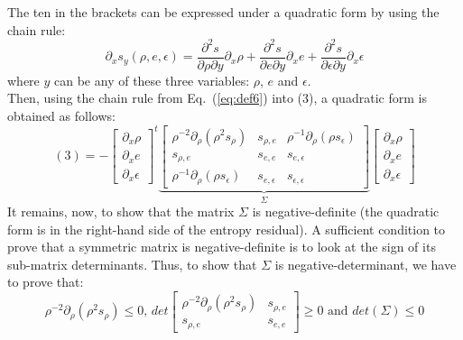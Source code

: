 \documentclass{article}
\newcommand{\eqt}[1]{Eq.~(\ref{#1})}                     %
\begin{document}
The ten in the brackets can be expressed under a quadratic form by using the chain rule:
\begin{equation}
\label{eq:def6}
\partial_x s_y (\rho, e, \epsilon) = \frac{\partial^2 s}{\partial \rho \partial y} \partial_x \rho + \frac{\partial^2 s}{\partial e \partial y} \partial_x e + \frac{\partial^2 s}{\partial \epsilon \partial y} \partial_x \epsilon
\end{equation}
where $y$ can be any of these three variables: $\rho$, $e$ and $\epsilon$. \\
Then, using the chain rule from \eqt{eq:def6} into (3), a quadratic form is obtained as follows:
\begin{equation}
(3) = -
\left[
\begin{array}{lll}
\partial_x \rho \nonumber \\
\partial_x e \nonumber \\
\partial_x \epsilon \nonumber
\end{array}
\right]^t
\underbrace{
\left[
\begin{array}{ccc}
\rho ^{-2} \partial_{\rho} \left( \rho^2 s_{\rho} \right) & s_{\rho,e} & \rho^{-1} \partial_{\rho} \left( \rho s_{\epsilon} \right) \nonumber \\
s_{\rho,e} & s_{e,e} & s_{e,\epsilon} \nonumber \\
\rho^{-1} \partial_{\rho} \left( \rho s_{\epsilon} \right) & s_{e,\epsilon} & s_{\epsilon, \epsilon} \nonumber
\end{array}
\right]}_{\Sigma}
\left[
\begin{array}{lll}
\partial_x \rho \nonumber \\
\partial_x e \nonumber \\
\partial_x \epsilon \nonumber
\end{array}
\right]
\end{equation}
It remains, now, to show that the matrix $\Sigma$ is negative-definite (the quadratic form is in the right-hand side of the entropy residual). A sufficient condition to prove that a symmetric matrix is negative-definite is to look at the sign of its sub-matrix determinants. Thus, to show that $\Sigma$ is negative-determinant, we have to prove that:
\begin{equation}
\label{eq:def7}
\rho ^{-2} \partial_{\rho} \left( \rho^2 s_{\rho} \right) \leq 0 \text{, }
det\left[
\begin{array}{cc}
\rho ^{-2} \partial_{\rho} \left( \rho^2 s_{\rho} \right) & s_{\rho,e} \\
s_{\rho,e} & s_{e,e}
\end{array}
\right] \geq 0
\text{ and }
det(\Sigma) \leq 0 \nonumber
\end{equation} 
\end{document}

